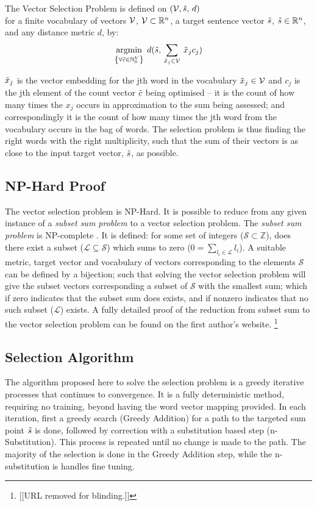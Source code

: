 \documentclass{llncs}
\DeclareMathOperator*{\argmin}{argmin}
\begin{document}
\begin{definition}{The Vector Selection Problem}
	is defined on $(\mathcal{V}, \tilde{s},\,d)$ \\for a finite vocabulary of vectors $\mathcal{V}$, $\mathcal{V}\subset{\mathbb{R}}^{n}$, a target sentence vector $ \tilde{s}$, $ \tilde{s}\in\mathbb{R}^{n}$, and any distance metric $d$, by:
		\[
		\argmin_{\left\{ \forall\c\in\N_{0}^{V}\right\} }\:d( \s,\,\sum_{\x_j\in\V}\:\x_{j}c_{j})
		\]
						
		$\tilde{x}_{j}$ is the vector embedding for the jth word in the vocabulary
		$\tilde{x}_{j}\in\mathcal{V}$ and $c_j$ is the jth element of the count vector $\tilde{c}$ being optimised -- it is the count of how many times the $x_j$ occurs in approximation to the sum being assessed; and correspondingly it is the count of how many times the jth word from the vocabulary occurs in the bag of words.
		The selection problem is thus finding the right words with the right multiplicity, such that the sum of their vectors is as close to the input target vector, $\tilde{s}$, as possible.
\end{definition}

\subsection{NP-Hard Proof}
The vector selection problem is NP-Hard. It is possible to reduce from any given instance of a \emph{subset sum problem} to a vector selection problem. The \emph{subset sum problem} is NP-complete \parencite{karp1972reducibility}. It is defined: for some set of integers ($\mathcal{S}\subset\mathbb{Z}$), does there exist a subset ($\mathcal{L}\subseteq\mathcal{S}$) which sums to zero ($0=\sum_{l_i\in \mathcal{L}} l_i$).  A suitable metric, target vector and  vocabulary of vectors corresponding to the elements $\mathcal{S}$ can be defined by a bijection; such that solving the vector selection problem will give the subset vectors corresponding a subset of $\mathcal{S}$ with the smallest sum; which if zero indicates that the subset sum does exists, and if nonzero indicates that no such subset ($\mathcal{L}$) exists. A fully detailed proof of the reduction from subset sum to the vector selection problem can be found on the first author's website. \footnote{[[URL removed for blinding.]]}

\subsection{Selection Algorithm}
The algorithm proposed here to solve the selection problem is a greedy iterative processes that continues to convergence. It is a fully deterministic method, requiring no training, beyond having the word vector mapping provided. In each iteration, first a greedy search (Greedy Addition) for a path to the targeted sum point $\tilde{s}$ is done, followed by correction with a substitution based step (n-Substitution). This process is repeated until no change is made to the path. The majority of the selection is done in the Greedy Addition step, while the n-substitution is handles fine tuning. 
\end{document}
